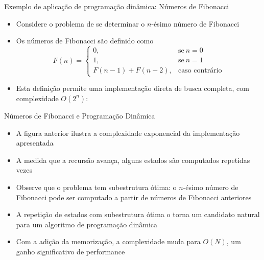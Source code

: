 \begin{frame}[fragile]{Exemplo de aplicação de programação dinâmica: Números de Fibonacci}


    \begin{itemize}
        \item Considere o problema de se determinar o $n$-ésimo número de Fibonacci

        \item Os números de Fibonacci são definido como
        \[
            F(n) = \left\{ \begin{array}{ll}
                    0,& \mbox{se}\ n = 0 \\
                    1,& \mbox{se}\ n = 1 \\
                    F(n - 1) + F(n - 2),& \mbox{caso contrário}
                \end{array}\right.
        \]

        \item Esta definição permite uma implementação direta de busca completa, com complexidade
            $O(2^n)$:


    \end{itemize}

\end{frame}



\begin{frame}[fragile]{Números de Fibonacci e Programação Dinâmica}

    \begin{itemize}
        \item A figura anterior ilustra a complexidade exponencial da implementação
            apresentada

        \item A medida que a recursão avança, alguns estados são computados repetidas vezes

        \item Observe que o problema tem subestrutura ótima: o $n$-ésimo número de Fibonacci pode
            ser computado a partir de números de Fibonacci anteriores

        \item A repetição de estados com subestrutura ótima o torna um candidato natural para um
            algoritmo de programação dinâmica

        \item Com a adição da memorização, a complexidade muda para $O(N)$, um ganho significativo
            de performance
    \end{itemize}

\end{frame}

